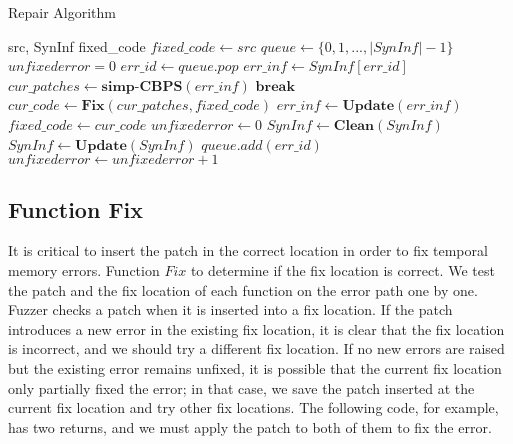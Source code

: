 \documentclass[a4paper,11pt,oneside,openany]{book}
\begin{document}
 \begin{algorithm}[t]
 \caption{Repair Algorithm}
 \label{repalgo}
 \begin{algorithmic}[1]
 \renewcommand{\algorithmicrequire}{\textbf{Input:}}
 \renewcommand{\algorithmicensure}{\textbf{Output:}}
 \REQUIRE src, SynInf
 \ENSURE  fixed\_code
  \STATE $fixed\_code \gets src$
  \STATE $queue \gets \{0,1,...,|SynInf|-1\}$
  \STATE $unfixederror = 0$
   \STATE $err\_id \gets queue.pop$
   \STATE $err\_inf \gets SynInf[err\_id]$
   \REPEAT
    \STATE $cur\_patches \gets \textbf{simp-CBPS}(err\_inf)$
     \STATE $\textbf{break}$
    \ENDIF
    \STATE $cur\_code \gets \textbf{Fix}(cur\_patches,fixed\_code)$
     \STATE $err\_inf \gets \textbf{Update}(err\_inf)$
    \ENDIF
    \STATE $fixed\_code \gets cur\_code$
    \STATE $unfixederror \gets 0$
     \STATE $SynInf \gets \textbf{Clean}(SynInf)$
     \STATE $SynInf \gets \textbf{Update}(SynInf)$
    \ENDIF
   \ELSE
    \STATE $queue.add(err\_id)$
    \STATE $unfixederror \gets unfixederror + 1$
   \ENDIF
  \ENDWHILE  
 \end{algorithmic} 
 \end{algorithm}


\subsection{Function Fix}
It is critical to insert the patch in the correct location in order to fix temporal memory errors. Function $Fix$ to determine if the fix location is correct. We test the patch and the fix location of each function on the error path one by one. Fuzzer checks a patch when it is inserted into a fix location. If the patch introduces a new error in the existing fix location, it is clear that the fix location is incorrect, and we should try a different fix location. If no new errors are raised but the existing error remains unfixed, it is possible that the current fix location only partially fixed the error; in that case, we save the patch inserted at the current fix location and try other fix locations. The following code, for example, has two returns, and we must apply the patch to both of them to fix the error.
\end{document}
